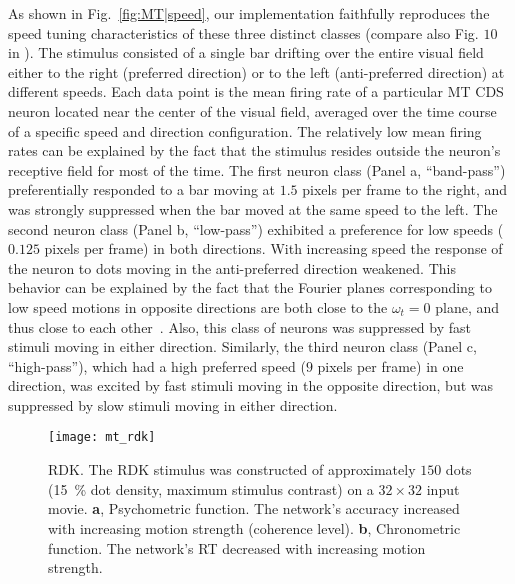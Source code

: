 As shown in Fig.~\ref{fig:MT|speed}, our implementation
faithfully reproduces the speed
tuning characteristics of these three distinct classes 
(compare also Fig. $10$ in \cite{SimoncelliHeeger1998}).
The stimulus consisted of a
single bar drifting over the entire visual field either to the right
(preferred direction) or to the left (anti-preferred direction) at
different speeds. Each data point is the mean firing rate of a
particular \ac{MT} \ac{CDS} neuron located near the center of the
visual field, averaged over the time course of a specific speed
and direction configuration. The relatively low mean firing
rates can be explained by the fact that the stimulus resides
outside the neuron's receptive field for most of the time. The
first neuron class (Panel a, ``band-pass'') preferentially
responded to a bar moving at $1.5$ pixels per frame to the right,
and was strongly suppressed when the bar moved at the same
speed to the left. The second neuron class (Panel b, ``low-pass'')
exhibited a preference for low speeds ($0.125$ pixels per
frame) in both directions. With increasing speed the response
of the neuron to dots moving in the anti-preferred direction
weakened. This behavior can be explained by the fact that the
Fourier planes corresponding to low speed motions in opposite
directions are both close to the $\omega_t=0$ plane, and thus close
to each other~\citep{SimoncelliHeeger1998}. Also, this class of
neurons was suppressed by fast stimuli moving in either
direction. Similarly, the third neuron class (Panel c, ``high-pass''),
which had a high preferred speed ($9$ pixels per frame)
in one direction, was excited by fast stimuli moving in the
opposite direction, but was suppressed by slow stimuli moving
in either direction.

\begin{figure}[t]
  \centering
  \texttt{[image: mt\_rdk]}
  \caption{
  \acf{RDK}. The \ac{RDK} stimulus was constructed of approximately 
  $150$ dots (\SI{15}{\percent} dot density, maximum stimulus
  contrast) on a $32\times32$ input movie.
  \textbf{a}, Psychometric function. The network's accuracy 
  increased with increasing motion strength (coherence level).
  \textbf{b}, Chronometric function. The network's \ac{RT}
  decreased with increasing motion strength.}
  \label{fig:MT|RDK}
\end{figure}


